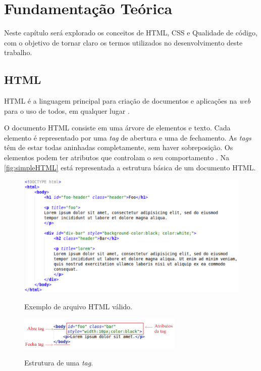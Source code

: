 %
%

\chapter{Fundamentação Teórica}
\label{chap:fund-teor}

Neste capítulo será explorado os conceitos de HTML, CSS e Qualidade de código, com o objetivo de tornar claro os termos utilizados no desenvolvimento deste trabalho.

\section{HTML}
\label{sec:html}
HTML é a linguagem principal para criação de documentos e aplicações na \textit{web} para o uso de todos, em qualquer lugar \cite{W3Chtml2015}.

O documento HTML consiste em uma árvore de elementos e texto. Cada elemento é representado por uma \textit{tag} de abertura e uma de fechamento. As \textit{tags} têm de estar todas aninhadas completamente, sem haver sobreposição. Os elementos podem ter atributos que controlam o seu comportamento \cite{HTMLspec2014}. Na \autoref{fig:simpleHTML} está representada a estrutura básica de um documento HTML.

\begin{figure}[!htb]
	\centering
	\caption{Exemplo de arquivo HTML válido.}
	\includegraphics[width=1\textwidth]{./04-figuras/html_simples}
	\label{fig:simpleHTML}
\end{figure}

\begin{figure}[!htb]
	\centering
	\caption{Estrutura de uma \textit{tag}.}
	\includegraphics[width=0.7\textwidth]{./04-figuras/tag_element_attr_marked}
	\label{fig:tagStruct}
\end{figure}


